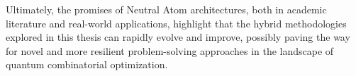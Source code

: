 Ultimately, the promises of Neutral Atom architectures, both in academic literature and real-world applications, highlight that the hybrid methodologies explored in this thesis can rapidly evolve and improve, possibly paving the way for novel and more resilient problem-solving approaches in the landscape of quantum combinatorial optimization.